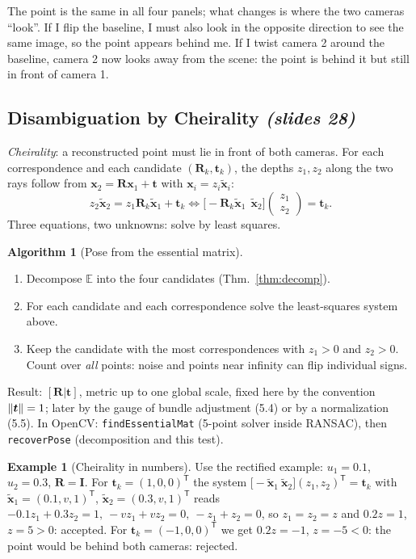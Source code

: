 \documentclass[11pt,a4paper]{article}
\newcommand{\slr}[1]{\texorpdfstring{\emph{(slides #1)}}{(slides #1)}}
\newcommand{\E}{\mathbb{E}}
\newcommand{\xt}{\tilde{\mathbf{x}}}
\newcommand{\tr}{^{\mathsf T}}
\newcommand{\z}{\bm{z}}
\theoremstyle{definition}
\newtheorem{example}[definition]{Example}
\newtheorem{algorithm}{Algorithm}[section]
\theoremstyle{plain}
\theoremstyle{remark}
\begin{document}
\begin{intuition}
The point is the same in all four panels; what changes is where the two cameras ``look''. If I flip the baseline, I must also look in the opposite direction to see the same image, so the point appears behind me. If I twist camera 2 around the baseline, camera 2 now looks away from the scene: the point is behind it but still in front of camera 1.
\end{intuition}

\subsection{Disambiguation by Cheirality \slr{28}}
\emph{Cheirality}: a reconstructed point must lie in front of both cameras. For each correspondence and each candidate $(\bm R_k,\bm t_k)$, the depths $z_1,z_2$ along the two rays follow from $\bm x_2=\bm R\bm x_1+\bm t$ with $\bm x_i=z_i\xt_i$:
\[
z_2\xt_2=z_1\bm R_k\xt_1+\bm t_k\iff\bigl[-\bm R_k\xt_1\ \ \xt_2\bigr]\begin{pmatrix}z_1\\z_2\end{pmatrix}=\bm t_k .
\]
Three equations, two unknowns: solve by least squares.

\begin{algorithm}[Pose from the essential matrix]\label{alg:cheir}
\begin{enumerate}[nosep]
\item Decompose $\E$ into the four candidates (Thm.~\ref{thm:decomp}).
\item For each candidate and each correspondence solve the least-squares system above.
\item Keep the candidate with the most correspondences with $z_1>0$ and $z_2>0$. Count over \emph{all} points: noise and points near infinity can flip individual signs.
\end{enumerate}
Result: $[\bm R|\bm t]$, metric up to one global scale, fixed here by the convention $\lVert \bm t\rVert=1$; later by the gauge of bundle adjustment (5.4) or by a normalization (5.5).
In OpenCV: \texttt{findEssentialMat} (5-point solver inside RANSAC), then \texttt{recoverPose} (decomposition and this test).
\end{algorithm}

\begin{example}[Cheirality in numbers]\label{ex:cheirnum}
Use the rectified example: $u_1=0.1$, $u_2=0.3$, $\bm R=\bm I$. For $\bm t_k=(1,0,0)\tr$ the system
$\bigl[-\xt_1\ \xt_2\bigr](z_1,z_2)\tr=\bm t_k$ with $\xt_1=(0.1,v,1)\tr$, $\xt_2=(0.3,v,1)\tr$ reads $-0.1z_1+0.3z_2=1,\ -vz_1+vz_2=0,\ -z_1+z_2=0$, so $z_1=z_2=z$ and $0.2z=1$, $z=5>0$: accepted.
For $\bm t_k=(-1,0,0)\tr$ we get $0.2z=-1$, $z=-5<0$: the point would be behind both cameras: rejected.
\end{example}
\end{document}
